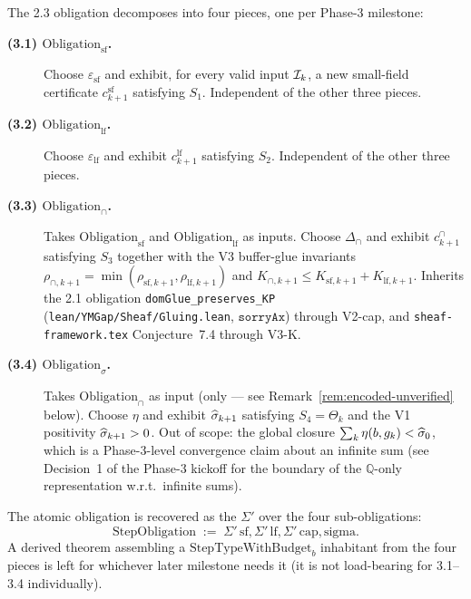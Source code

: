 \begin{definition}
\label{def:sub-obligations}
The 2.3 obligation decomposes into four pieces, one per Phase-3
milestone:

\begin{description}
\item[\textnormal{\textbf{(3.1) $\mathrm{Obligation}_{\mathrm{sf}}$.}}]
Choose $\varepsilon_{\mathrm{sf}}$ and exhibit, for every valid
input $\mathcal{I}_k$, a new small-field certificate $c^{\mathrm{sf}}_{k+1}$
satisfying $S_1$.  Independent of the other three pieces.

\item[\textnormal{\textbf{(3.2) $\mathrm{Obligation}_{\mathrm{lf}}$.}}]
Choose $\varepsilon_{\mathrm{lf}}$ and exhibit $c^{\mathrm{lf}}_{k+1}$
satisfying $S_2$.  Independent of the other three pieces.

\item[\textnormal{\textbf{(3.3) $\mathrm{Obligation}_{\cap}$.}}]
Takes $\mathrm{Obligation}_{\mathrm{sf}}$ and $\mathrm{Obligation}_{\mathrm{lf}}$
as inputs.  Choose $\Delta_{\cap}$ and exhibit $c^{\cap}_{k+1}$
satisfying $S_3$ together with the V3 buffer-glue invariants
$\rho_{\cap, k+1} = \min(\rho_{\mathrm{sf}, k+1}, \rho_{\mathrm{lf}, k+1})$
and $K_{\cap, k+1} \le K_{\mathrm{sf}, k+1} + K_{\mathrm{lf}, k+1}$.
Inherits the 2.1 obligation \texttt{domGlue\_preserves\_KP}
(\texttt{lean/YMGap/Sheaf/Gluing.lean}, $\mathtt{sorryAx}$) through
V2-cap, and \texttt{sheaf-framework.tex} Conjecture~7.4 through V3-K.

\item[\textnormal{\textbf{(3.4) $\mathrm{Obligation}_{\sigma}$.}}]
Takes $\mathrm{Obligation}_{\cap}$ as input (only --- see
Remark~\ref{rem:encoded-unverified} below).  Choose $\eta$ and
exhibit $\widehat{\sigma}_{k+1}$ satisfying $S_4 = \Theta_k$ and the V1
positivity $\widehat{\sigma}_{k+1} > 0$.  Out of scope: the global closure
$\sum_k \eta(b, g_k) < \widehat{\sigma}_0$, which is a Phase-3-level
convergence claim about an infinite sum (see Decision~1 of the
Phase-3 kickoff for the boundary of the $\mathbb{Q}$-only
representation w.r.t.\ infinite sums).
\end{description}

The atomic obligation is recovered as the $\Sigma'$ over the four
sub-obligations:
\begin{equation*}
  \mathrm{StepObligation} \;:=\; \Sigma' \, \mathrm{sf}, \Sigma'\, \mathrm{lf}, \Sigma'\, \mathrm{cap}, \mathrm{sigma}.
\end{equation*}
A derived theorem assembling a $\mathrm{StepTypeWithBudget}_b$
inhabitant from the four pieces is left for whichever later
milestone needs it (it is not load-bearing for 3.1--3.4
individually).
\end{definition}

